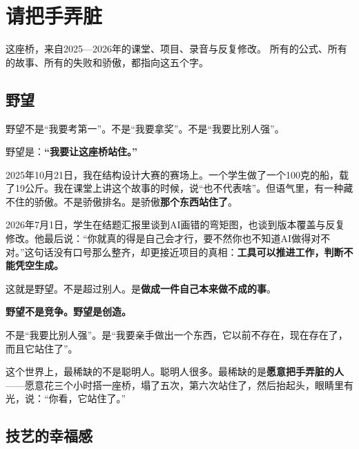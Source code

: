
\chapter{请把手弄脏}

\vspace{0.5cm}

\begin{center}
{\small\color{muted} 这座桥，来自2025—2026年的课堂、项目、录音与反复修改。}
{\small\color{muted} 所有的公式、所有的故事、所有的失败和骄傲，都指向这五个字。}
\end{center}

\vspace{1cm}

\section{野望}

野望不是``我要考第一''。不是``我要拿奖''。不是``我要比别人强''。

野望是：\textbf{``我要让这座桥站住。''}

2025年10月21日，我在结构设计大赛的赛场上。一个学生做了一个100克的船，载了19公斤。我在课堂上讲这个故事的时候，说``也不代表啥''。但语气里，有一种藏不住的骄傲。不是骄傲排名。是骄傲\textbf{那个东西站住了}。

2026年7月1日，学生在结题汇报里谈到AI画错的弯矩图，也谈到版本覆盖与反复修改。他最后说：``你就真的得是自己会才行，要不然你也不知道AI做得对不对。''这句话没有口号那么整齐，却更接近项目的真相：\textbf{工具可以推进工作，判断不能凭空生成。}

这就是野望。不是超过别人。是\textbf{做成一件自己本来做不成的事}。

\begin{insight}
\label{insight:chap15}

\textbf{野望不是竞争。野望是创造。}

不是``我要比别人强''。是``我要亲手做出一个东西，它以前不存在，现在存在了，而且它站住了''。

这个世界上，最稀缺的不是聪明人。聪明人很多。最稀缺的是\textbf{愿意把手弄脏的人}——愿意花三个小时搭一座桥，塌了五次，第六次站住了，然后抬起头，眼睛里有光，说：``你看，它站住了。''
\end{insight}

\section{技艺的幸福感}


